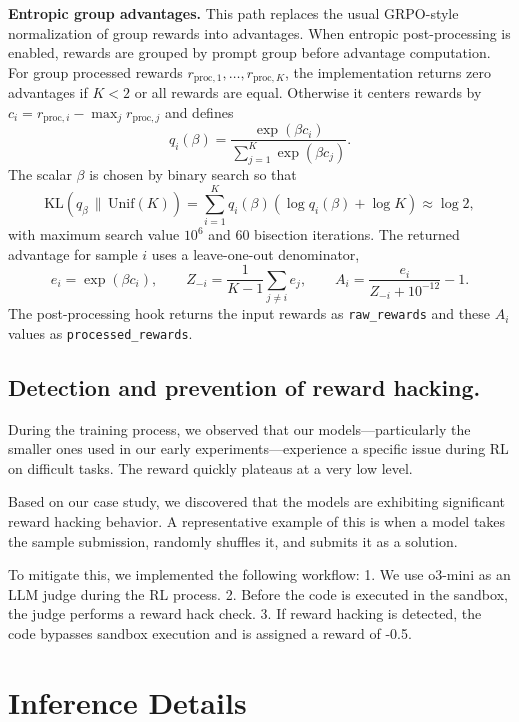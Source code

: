 \textbf{Entropic group advantages.}
This path replaces the usual GRPO-style normalization of group rewards into advantages.
When entropic post-processing is enabled, rewards are grouped by prompt group before advantage computation.
For group processed rewards $r_{\mathrm{proc},1},\ldots,r_{\mathrm{proc},K}$, the implementation returns zero advantages if $K<2$ or all rewards are equal.
Otherwise it centers rewards by $c_i=r_{\mathrm{proc},i}-\max_j r_{\mathrm{proc},j}$ and defines
\begin{equation}
\label{eq:entr}
q_i(\beta)=\frac{\exp(\beta c_i)}{\sum_{j=1}^{K}\exp(\beta c_j)}.
\end{equation}
The scalar $\beta$ is chosen by binary search so that
\begin{equation}
\label{eq:kl}
\mathrm{KL}\!\left(q_\beta\,\|\,\mathrm{Unif}(K)\right)
= \sum_{i=1}^{K} q_i(\beta)\left(\log q_i(\beta)+\log K\right)
\approx \log 2,
\end{equation}
with maximum search value $10^6$ and 60 bisection iterations.
The returned advantage for sample $i$ uses a leave-one-out denominator,
\[
e_i=\exp(\beta c_i),\qquad
Z_{-i}=\frac{1}{K-1}\sum_{j\ne i} e_j,\qquad
A_i=\frac{e_i}{Z_{-i}+10^{-12}}-1.
\]
The post-processing hook returns the input rewards as \texttt{raw\_rewards} and these $A_i$ values as \texttt{processed\_rewards}.


\subsection{Detection and prevention of reward hacking.}

During the training process, we observed that our models—particularly the smaller ones used in our early experiments—experience a specific issue during RL on difficult tasks. The reward quickly plateaus at a very low level.

Based on our case study, we discovered that the models are exhibiting significant reward hacking behavior. A representative example of this is when a model takes the sample submission, randomly shuffles it, and submits it as a solution.

To mitigate this, we implemented the following workflow:
1. We use o3-mini as an LLM judge during the RL process.
2. Before the code is executed in the sandbox, the judge performs a reward hack check.
3. If reward hacking is detected, the code bypasses sandbox execution and is assigned a reward of -0.5.

\section{\openmleevo{} Inference Details}

